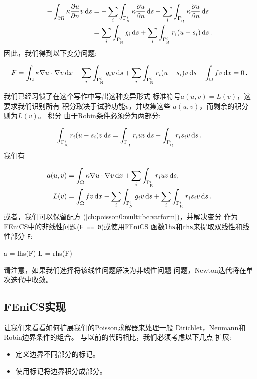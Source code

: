 \begin{align*}
-\int_{\partial\Omega} \kappa\frac{\partial u}{\partial n}v \, \mathrm{d}s
&=
-\sum_i\int_{\Gamma_{_\mathrm{N}}^i} \kappa\frac{\partial u}{\partial n} \, \mathrm{d}s
-\sum_i\int_{\Gamma_{_\mathrm{R}}^i} \kappa\frac{\partial u}{\partial n} \, \mathrm{d}s\\
&=
\sum_i\int_{\Gamma_{_\mathrm{N}}^i}g_i \, \mathrm{d}s +
\sum_i\int_{\Gamma_{_\mathrm{R}}^i}r_i(u-s_i) \, \mathrm{d}s\thinspace .
\end{align*}
因此，我们得到以下变分问题:

\begin{equation}
F = \int_{\Omega} \kappa\nabla u\cdot \nabla v \, \mathrm{d}x +
\sum_i\int_{\Gamma_{_\mathrm{N}}^i} g_iv \, \mathrm{d}s +
\sum_i\int_{\Gamma_{_\mathrm{R}}^i}r_i(u-s_i)v \, \mathrm{d}s
- \int_{\Omega} fv \, \mathrm{d}x =0\thinspace .
\label{ch:poisson0:multi:bc:varform}
\end{equation}

我们已经习惯了在这个写作中写出这种变异形式
标准符号$a(u,v)= L(v)$，这要求我们识别所有
积分取决于试验功能$u$，并收集这些
$a(u,v)$，而剩余的积分则为$L(v)$。 积分
由于Robin条件必须分为两部分:

\begin{equation*}
\int_{\Gamma_{_\mathrm{R}}^i}r_i(u-s_i)v \, \mathrm{d}s
= \int_{\Gamma_{_\mathrm{R}}^i} r_iuv \, \mathrm{d}s - \int_{\Gamma_{_\mathrm{R}}^i}r_is_iv \, \mathrm{d}s\thinspace .
\end{equation*}
我们有

\begin{align}
a(u, v) &= \int_{\Omega} \kappa\nabla u\cdot \nabla v \, \mathrm{d}x
+ \sum_i\int_{\Gamma_{_\mathrm{R}}^i}r_iuv \, \mathrm{d}s,
\label{ch:poisson0:2D:DN3:var:a}\\
L(v) &= \int_{\Omega} fv \, \mathrm{d}x -
\sum_i\int_{\Gamma_{_\mathrm{N}}^i} g_i v \, \mathrm{d}s + \sum_i\int_{\Gamma_{_\mathrm{R}}^i}r_is_iv \, \mathrm{d}s\thinspace .
\label{ch:poisson0:2D:DN3:var:L}
\end{align}
或者，我们可以保留配方
(\ref{ch:poisson0:multi:bc:varform})，并解决变分
作为FEniCS中的非线性问题(\texttt{F == 0})或使用FEniCS
函数\texttt{lhs}和\texttt{rhs}来提取双线性和线性部分
\texttt{F}:

\begin{python}
a = lhs(F)
L = rhs(F)
\end{python}
请注意，如果我们选择将该线性问题解决为非线性问题
问题，Newton迭代将在单次迭代中收敛。

\subsection{FEniCS实现}

让我们来看看如何扩展我们的Poisson求解器来处理一般
Dirichlet，Neumann和Robin边界条件的组合。
与以前的代码相比，我们必须考虑以下几点
扩展:

\begin{itemize}
  \item 定义边界不同部分的标记。

  \item 使用标记将边界积分成部分。
\end{itemize}

